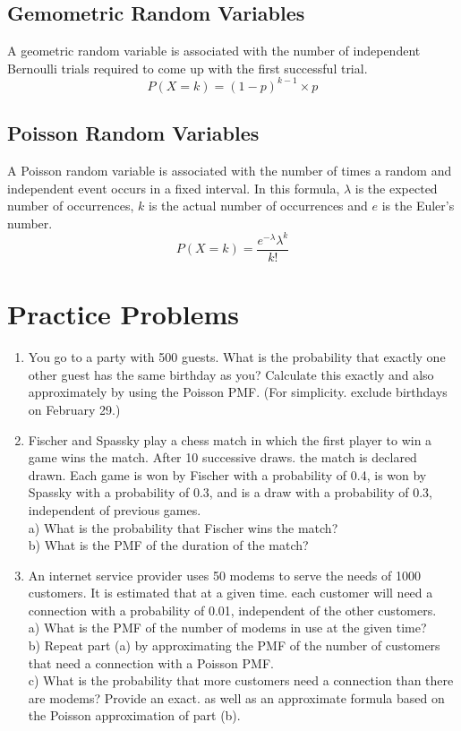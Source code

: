 \documentclass[11pt]{article}
\begin{document}
\subsection{Gemometric Random Variables}
A geometric random variable is associated with the number of independent Bernoulli trials required to come up with the first successful trial. 
$$P(X = k) = (1-p)^{k-1} \times p$$

\subsection{Poisson Random Variables}
A Poisson random variable is associated with the number of times a random and independent event occurs in a fixed interval.
In this formula, $\lambda$ is the expected number of occurrences, $k$ is the actual number of occurrences and $e$ is the Euler's number.
$$P(X = k) = \frac{e^{-\lambda}\lambda^k}{k!}$$

\section{Practice Problems}

\begin{enumerate}
  \item You go to a party with 500 guests. What is the probability that exactly one other guest has the same birthday as you? Calculate this exactly and also approximately by using the Poisson PMF. (For simplicity. exclude birthdays on February 29.)
  \item Fischer and Spassky play a chess match in which the first player to win a game wins the match. After 10 successive draws. the match is declared drawn. Each game is won by Fischer with a probability of 0.4, is won by Spassky with a probability of 0.3, and is a draw with a probability of 0.3, independent of previous games.
  \\a) What is the probability that Fischer wins the match?
  \\b) What is the PMF of the duration of the match?
  \item An internet service provider uses 50 modems to serve the needs of 1000 customers. It is estimated that at a given time. each customer will need a connection with a probability of 0.01, independent of the other customers.
  \\a) What is the PMF of the number of modems in use at the given time?
  \\b) Repeat part (a) by approximating the PMF of the number of customers that
  need a connection with a Poisson PMF.
  \\c) What is the probability that more customers need a connection than there are modems? Provide an exact. as well as an approximate formula based on the Poisson approximation of part (b).
\end{enumerate}
\end{document}
